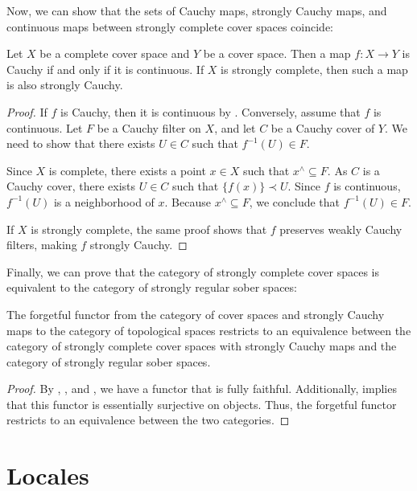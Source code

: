 \documentclass[reqno]{amsart}
\theoremstyle{definition}
\theoremstyle{remark}
\numberwithin{figure}{section}
\newcommand{\rb}{\prec}
\begin{document}
Now, we can show that the sets of Cauchy maps, strongly Cauchy maps, and continuous maps between strongly complete cover spaces coincide:

\begin{prop}
Let $X$ be a complete cover space and $Y$ be a cover space.
Then a map $f : X \to Y$ is Cauchy if and only if it is continuous.
If $X$ is strongly complete, then such a map is also strongly Cauchy.
\end{prop}
\begin{proof}
If $f$ is Cauchy, then it is continuous by .  
Conversely, assume that $f$ is continuous.  
Let $F$ be a Cauchy filter on $X$, and let $C$ be a Cauchy cover of $Y$.  
We need to show that there exists $U \in C$ such that $f^{-1}(U) \in F$.  

Since $X$ is complete, there exists a point $x \in X$ such that $x^\wedge \subseteq F$.  
As $C$ is a Cauchy cover, there exists $U \in C$ such that $\{ f(x) \} \rb U$.  
Since $f$ is continuous, $f^{-1}(U)$ is a neighborhood of $x$.  
Because $x^\wedge \subseteq F$, we conclude that $f^{-1}(U) \in F$.  

If $X$ is strongly complete, the same proof shows that $f$ preserves weakly Cauchy filters, making $f$ strongly Cauchy.
\end{proof}

Finally, we can prove that the category of strongly complete cover spaces is equivalent to the category of strongly regular sober spaces:

\begin{thm}
The forgetful functor from the category of cover spaces and strongly Cauchy maps to the category of topological spaces restricts to an equivalence between the category of strongly complete cover spaces with strongly Cauchy maps and the category of strongly regular sober spaces.
\end{thm}
\begin{proof}
By , , and , we have a functor that is fully faithful.  
Additionally,  implies that this functor is essentially surjective on objects.  
Thus, the forgetful functor restricts to an equivalence between the two categories.
\end{proof}

\section{Locales}
\label{sec:locales}
\end{document}
